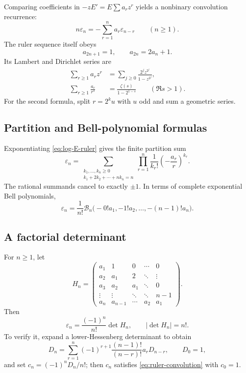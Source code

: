 \documentclass[11pt,oneside]{article}
\numberwithin{equation}{section}
\theoremstyle{definition}
\theoremstyle{remark}
\newcommand{\eps}{\varepsilon}
\newcommand{\Bell}{\mathcal B}
\begin{document}
Comparing coefficients in \(-zE'=E\sum a_rz^r\) yields a nonbinary
convolution recurrence:
\begin{equation}
 \boxed{n\eps_n=-\sum_{r=1}^na_r\eps_{n-r}\qquad(n\ge1).}
 \label{eq:ruler-convolution}
\end{equation}
The ruler sequence itself obeys
\begin{equation}
 a_{2n+1}=1,\qquad a_{2n}=2a_n+1.
 \label{eq:ruler-recursion}
\end{equation}
Its Lambert and Dirichlet series are
\begin{align}
 \sum_{r\ge1}a_rz^r
 &=\sum_{j\ge0}\frac{2^jz^{2^j}}{1-z^{2^j}},
 \label{eq:ruler-Lambert}\\
 \sum_{r\ge1}\frac{a_r}{r^s}
 &=\boxed{\frac{\zeta(s)}{1-2^{1-s}}}\qquad(\Re s>1).
 \label{eq:ruler-Dirichlet}
\end{align}
For the second formula, split \(r=2^ku\) with \(u\) odd and sum a geometric
series.

\subsection{Partition and Bell-polynomial formulas}

Exponentiating \eqref{eq:log-E-ruler} gives the finite partition sum
\begin{equation}
 \boxed{\eps_n=
 \sum_{\substack{k_1,\ldots,k_n\ge0\\
                  k_1+2k_2+\cdots+nk_n=n}}
 \prod_{r=1}^n\frac1{k_r!}
 \left(-\frac{a_r}{r}\right)^{k_r}.}
 \label{eq:partition-formula}
\end{equation}
The rational summands cancel to exactly \(\pm1\).  In terms of complete
exponential Bell polynomials,
\begin{equation}
 \boxed{\eps_n=\frac1{n!}\Bell_n
 \bigl(-0!a_1,-1!a_2,\ldots,-(n-1)!a_n\bigr).}
 \label{eq:Bell-formula}
\end{equation}

\subsection{A factorial determinant}

For \(n\ge1\), let
\begin{equation}
 H_n=\begin{pmatrix}
 a_1&1&0&\cdots&0\\
 a_2&a_1&2&\ddots&\vdots\\
 a_3&a_2&a_1&\ddots&0\\
 \vdots&\vdots&\ddots&\ddots&n-1\\
 a_n&a_{n-1}&\cdots&a_2&a_1
 \end{pmatrix}.
 \label{eq:Hessenberg}
\end{equation}
Then
\begin{equation}
 \boxed{\eps_n=\frac{(-1)^n}{n!}\det H_n,\qquad
 |\det H_n|=n!.}
 \label{eq:Hessenberg-formula}
\end{equation}
To verify it, expand a lower-Hessenberg determinant to obtain
\[
 D_n=\sum_{r=1}^n(-1)^{r+1}\frac{(n-1)!}{(n-r)!}a_rD_{n-r},
 \qquad D_0=1,
\]
and set \(c_n=(-1)^nD_n/n!\); then \(c_n\) satisfies
\eqref{eq:ruler-convolution} with \(c_0=1\).
\end{document}
